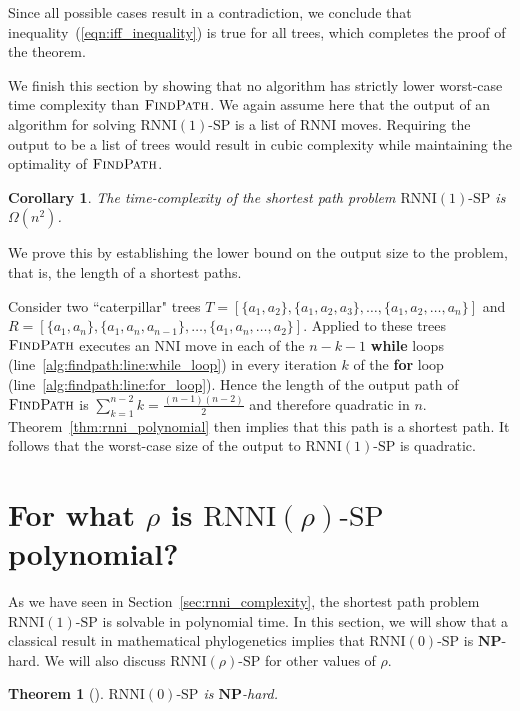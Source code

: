 \documentclass[11pt]{amsart}
\newtheorem{theorem}{Theorem}
\newtheorem{corollary}{Corollary}
\newcommand{\rnni}{\mathrm{RNNI}}
\newcommand{\findpath}{\textsc{FindPath}}
\newcommand{\nni}{\mathrm{NNI}}
\newcommand{\np}{\mathbf{NP}}
\newcommand{\decprob}[1]{\rnni(#1)\text{-}\mathrm{SP}}
\begin{document}
Since all possible cases result in a contradiction, we conclude that inequality~(\ref{eqn:iff_inequality}) is true for all trees, which completes the proof of the theorem.
\endproof

We finish this section by showing that no algorithm has strictly lower worst-case time complexity than $\findpath$.
We again assume here that the output of an algorithm for solving $\decprob{1}$ is a list of $\rnni$ moves.
Requiring the output to be a list of trees would result in cubic complexity while maintaining the optimality of $\findpath$.

\begin{corollary}
The time-complexity of the shortest path problem $\decprob{1}$ is $\Omega(n^2)$.
\end{corollary}

\proof
We prove this by establishing the lower bound on the output size to the problem, that is, the length of a shortest paths.

Consider two ``caterpillar" trees $T = [\{a_1, a_2\}, \{a_1, a_2, a_3\}, \ldots, \{a_1, a_2, \ldots, a_n\}]$ and $R = [\{a_1,a_n\}, \{a_1, a_n, a_{n-1}\}, \ldots, \{a_1, a_n, \ldots, a_2\}]$.
Applied to these trees $\findpath$ executes an $\nni$ move in each of the $n-k-1$ \textbf{while} loops (line~\ref{alg:findpath:line:while_loop}) in every iteration $k$ of the \textbf{for} loop (line~\ref{alg:findpath:line:for_loop}).
Hence the length of the output path of $\findpath$ is $\sum\limits_{k = 1}^{n - 2} k = \frac{(n-1)(n-2)}{2}$ and therefore quadratic in $n$.
Theorem~\ref{thm:rnni_polynomial} then implies that this path is a shortest path.
It follows that the worst-case size of the output to $\decprob{1}$ is quadratic.
\endproof


\section{For what $\rho$ is $\decprob{\rho}$ polynomial?}

As we have seen in Section~\ref{sec:rnni_complexity}, the shortest path problem $\decprob{1}$ is solvable in polynomial time.
In this section, we will show that a classical result in mathematical phylogenetics implies that $\decprob{0}$ is $\np$-hard.
We will also discuss $\decprob{\rho}$ for other values of $\rho$.

\begin{theorem}[\textcite{Dasgupta2000-xa}]
$\decprob{0}$ is $\np$-hard.
\label{thm:nni_hard}
\end{theorem}
\end{document}
